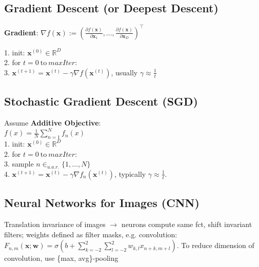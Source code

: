 \subsection*{Gradient Descent (or Deepest Descent)}
\textbf{Gradient}: $\nabla f(\mathbf{x}) := \left( \frac{\partial f(\mathbf{x})}{\partial \mathbf{x}_1}, \ldots, \frac{\partial f(\mathbf{x})}{\partial \mathbf{x}_D} \right)^\top$

1. init: $\mathbf{x}^{(0)} \in \mathbb{R}^D$\\
2. for $t = 0 \ \text{to} \ \mathit{maxIter}$:\\
3. $\mathbf{x}^{(t+1)} = \mathbf{x}^{(t)} - \gamma \nabla f(\mathbf{x}^{(t)})$, usually $\gamma \approx \frac{1}{t}$

\subsection*{Stochastic Gradient Descent (SGD)}
Assume \textbf{Additive Objective}:\\
$f(x) = \frac{1}{N}\sum_{n=1}^{N}f_n(x)$\\
1. init: $\mathbf{x}^{(0)} \in \mathbb{R}^D$\\
2. for $t = 0 \ \text{to} \ \mathit{maxIter}$:\\
3. sample $n \in_{u.a.r.} \{1, \ldots, N\}$\\
4. $\mathbf{x}^{(t+1)} = \mathbf{x}^{(t)} - \gamma \nabla f_n(\mathbf{x}^{(t)})$, typically  $\gamma \approx \frac{1}{t}$.

\subsection*{Neural Networks for Images (CNN)}
Translation invariance of images $\rightarrow$ neurons compute same fct, shift invariant filters; weights defined as filter masks, e.g. convolution: $F_{n,m}(\mathbf{x};\mathbf{w}) = \sigma(b + \sum_{k=-2}^2\sum_{l=-2}^{2}{w_{k,l}x_{n+k,m+l}})$. To reduce dimension of convolution, use \{max, avg\}-pooling